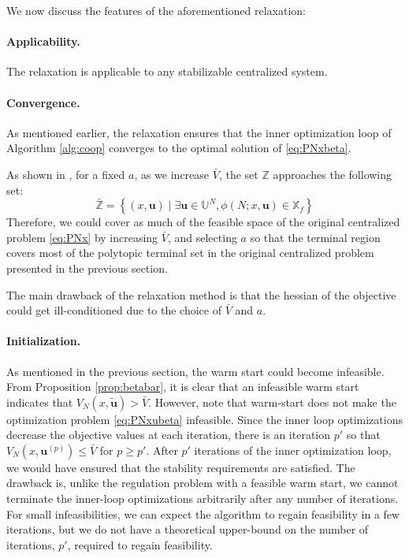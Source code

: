 \documentclass[10pt]{article}
\newcommand{\bu}{\mathbf{u}}
\newcommand{\set}[1]{\left\lbrace #1 \right\rbrace}
\theoremstyle{definition}
\begin{document}
We now discuss the features of the aforementioned relaxation:
\paragraph{Applicability.} The relaxation is applicable to any
stabilizable centralized system. 

\paragraph{Convergence.} As mentioned earlier, the relaxation ensures
that the inner optimization loop of Algorithm \ref{alg:coop} converges
to the optimal solution of \eqref{eq:PNxbeta}. 

As shown in
\citet{pannocchia:rawlings:wright:2011}, for a fixed $a$, as we
increase $\bar{V}$, the set $\mathbb{Z}$ approaches the following set:
\[\bar{\mathbb{Z}} =  \set{(x,\bu) \mid \exists \bu \in \mathbb{U}^N,
  \phi(N;x,\bu) \in \mathbb{X}_f}\]
Therefore, we could cover as much of the  feasible space  of the original
centralized problem \eqref{eq:PNx} by increasing $\bar{V}$, and
selecting $a$ so that the terminal region covers most of the polytopic
terminal set in the original centralized problem presented in the
previous section.

The main drawback of the
relaxation method is that the hessian of the objective could get
ill-conditioned due to the choice of $\bar{V}$ and $a$.

\paragraph{Initialization.} As mentioned in the previous section, the
warm start could become infeasible. From Proposition
\ref{prop:betabar}, it is clear that an infeasible warm start
indicates that $V_N(x,\tilde{\bu}) > \bar{V}$. However, note that
warm-start does not make the optimization problem \eqref{eq:PNxubeta}
infeasible. Since the inner loop optimizations decrease the objective
values at each iteration, there is an iteration $p'$ so that  $V_N(x,\bu^{(p)})
\leq \bar{V}$ for $p \geq p'$.  
After $p'$ iterations of the inner optimization loop, we would have 
ensured that the stability requirements are satisfied. The drawback is, unlike the regulation problem
with a feasible warm start, we cannot terminate the inner-loop
optimizations arbitrarily after any number of iterations. For small
infeasibilities, we can expect the algorithm to regain feasibility in
a few iterations, but we do not have a theoretical upper-bound on the
number of iterations, $p'$, required to regain feasibility.
\end{document}
